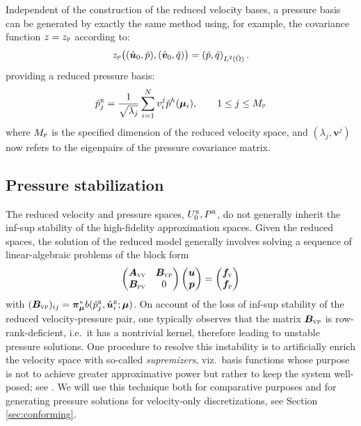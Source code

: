 \documentclass[onecolumn, twoside, a4paper, 11pt]{article}
\begin{document}
Independent of the construction of the reduced velocity bases, a pressure basis can
be generated by exactly the same method using, for example, the covariance function
$z=z_\textsc{p}$ according to:
%
\begin{equation}
z_\textsc{p}\big((\hat{\bm u}_0, \hat{p}), (\hat{\bm v}_0, \hat{q})\big) =
  \left( \hat{p}, \hat{q} \right)_{L^2(\hat{\Omega})}.
\end{equation}
%
providing a reduced pressure basis:
%
\begin{equation}
  \label{eqn:pRj}
  \hat{p}^\textsc{r}_j = \frac{1}{\sqrt{\lambda_j}} \sum_{i=1}^N v^{j}_i \hat{p}^h(\bm{\mu}_i),
  \qquad 1 \leq j \leq M_\textsc{p}
\end{equation}
%
where $M_\textsc{p}$ is the specified dimension of the reduced velocity space, and $(\lambda_j,\bm{v}^j)$ now
refers to the eigenpairs of the pressure covariance matrix.


\subsection{Pressure stabilization}
\label{sec:stab}
The reduced velocity and pressure spaces, $U_0^{\textsc{r}},P^{\textsc{r}}$, do not generally inherit the
inf-sup stability of the high-fidelity approximation spaces. Given the reduced spaces, the solution of
the reduced model generally involves solving a sequence of linear-algebraic problems of the block form
%
\begin{equation}
  \label{eqn:sys-instab}
  \begin{pmatrix} \bm A_\textsc{vv} & \bm B_\textsc{vp} \\ \bm B_\textsc{pv} & 0\end{pmatrix}
  \begin{pmatrix} \bm u \\ \bm p \end{pmatrix}
  =
  \begin{pmatrix} \bm f_\textsc{v} \\ \bm f_\textsc{p} \end{pmatrix}
\end{equation}
%
with $(\bm B_\textsc{vp})_{ij}=\bm{\pi}^*_{\bm{\mu}}b(\hat{p}_j^\textsc{r},\hat{\bm{u}}_i^\textsc{r};\bm{\mu})$.
On account of the loss of inf-sup stability of the reduced velocity-pressure pair,
one typically observes that the matrix $\bm B_\textsc{vp}$ is row-rank-deficient, i.e.~it
has a nontrivial kernel, therefore leading to unstable pressure solutions. One procedure to resolve this
instability is to artificially enrich the velocity space with so-called
\emph{supremizers}, viz.~basis functions whose purpose is not to achieve greater approximative power but
rather to keep the system well-posed; see \cite{Ballarin2015ssp}. We will use this technique
both for comparative purposes and for generating pressure solutions for velocity-only
discretizations, see Section \ref{sec:conforming}.
\end{document}
